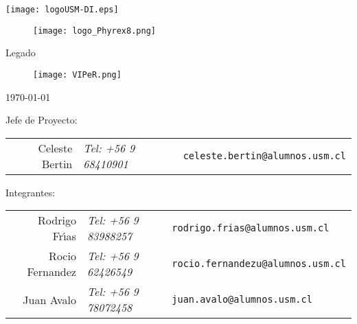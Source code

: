\begin{titlepage} %
\thispagestyle{empty} %
\begin{center}
\texttt{[image: logoUSM-DI.eps]}
\end{center}

\begin{center} %
  {
    \begin{figure}[H]
      \centering
      \texttt{[image: logo\_Phyrex8.png]}
      \label{fig:Phyrex}
    \end{figure}
    \Huge Legado\\
    \begin{figure}[H]
      \centering
      \texttt{[image: VIPeR.png]}
      \label{fig:Viper}
    \end{figure}
    \normalsize \today
  }
\end{center}

\vspace{1cm}


\vfill
\begin{flushleft} %
  Jefe de Proyecto: 
  \begin{table}[H]
    \centering
    \begin{tabular}{rll}
      Celeste Bertin     & \emph{Tel: +56 9 68410901} & \texttt{\small celeste.bertin@alumnos.usm.cl}  \\
    \end{tabular}          
  \end{table}              
  Integrantes:             
  \begin{table}[H]         
    \centering             
    \begin{tabular}{rll}   
      Rodrigo Fr\'{\i}as & \emph{Tel: +56 9 83988257} & \texttt{\small rodrigo.frias@alumnos.usm.cl}   \\
      Rocio Fernandez    & \emph{Tel: +56 9 62426549} & \texttt{\small rocio.fernandezu@alumnos.usm.cl}\\
      Juan Avalo         & \emph{Tel: +56 9 78072458} & \texttt{\small juan.avalo@alumnos.usm.cl}      \\
    \end{tabular}
  \end{table}
\end{flushleft}
\end{titlepage}
